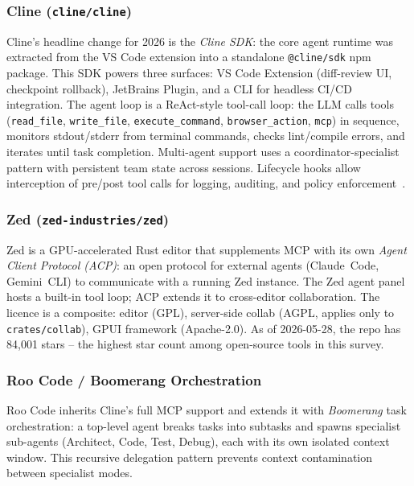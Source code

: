\subsubsection{Cline (\texttt{cline/cline})}
Cline's headline change for 2026 is the \emph{Cline SDK}: the core agent
runtime was extracted from the VS Code extension into a standalone
\texttt{@cline/sdk} npm package.  This SDK powers three surfaces: VS Code
Extension (diff-review UI, checkpoint rollback), JetBrains Plugin, and a
CLI for headless CI/CD integration.  The agent loop is a ReAct-style
tool-call loop: the LLM calls tools (\texttt{read\_file},
\texttt{write\_file}, \texttt{execute\_command}, \texttt{browser\_action},
\texttt{mcp}) in sequence, monitors stdout/stderr from terminal commands,
checks lint/compile errors, and iterates until task completion.  Multi-agent
support uses a coordinator-specialist pattern with persistent team state
across sessions.  Lifecycle hooks allow interception of pre/post tool calls
for logging, auditing, and policy enforcement~\cite{agentic_ide_landscape_deep}.

\subsubsection{Zed (\texttt{zed-industries/zed})}
Zed is a GPU-accelerated Rust editor that supplements MCP with its own
\emph{Agent Client Protocol (ACP)}: an open protocol for external agents
(Claude~Code, Gemini~CLI) to communicate with a running Zed instance.  The
Zed agent panel hosts a built-in tool loop; ACP extends it to cross-editor
collaboration.  The licence is a composite: editor (GPL), server-side collab
(AGPL, applies only to \texttt{crates/collab}), GPUI framework (Apache-2.0).
As of 2026-05-28, the repo has 84,001 stars -- the highest star count among
open-source tools in this survey.

\subsubsection{Roo Code / Boomerang Orchestration}
Roo Code inherits Cline's full MCP support and extends it with
\emph{Boomerang} task orchestration: a top-level agent breaks tasks into
subtasks and spawns specialist sub-agents (Architect, Code, Test, Debug),
each with its own isolated context window.  This recursive delegation pattern
prevents context contamination between specialist modes.


